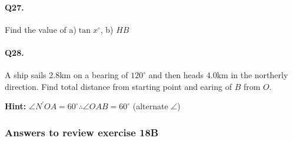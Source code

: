 \documentclass{article}
\begin{document}
\paragraph{Q27.}
Find the value of a)$\tan x^{\circ}$, b) $HB$

\paragraph{Q28.}
A ship sails $2.8$km on a bearing of $120^{\circ}$ and then heads $4.0$km in the northerly direction. Find total distance from starting point and earing of $B$ from $O$.

{\scriptsize \textbf{Hint:}}
$\angle N^{'}OA = 60^{\circ} \therefore \angle OAB = 60^{\circ}$ (alternate $\angle$)

\subsubsection {Answers to review exercise 18B}
\end{document}
